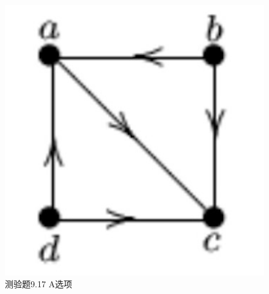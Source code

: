 \documentclass[UTF8, heading=true]{ctexart}
\begin{document}
\begin{figure}[H]
  \centering
  \begin{minipage}[t]{0.22\textwidth}
      \centering
      \includegraphics[width=1\textwidth]{9.17_1.jpg} %
      \vspace{-0.3cm}
      \caption{测验题9.17 A选项}
  \end{minipage}
  \hspace{0.18\textwidth} %
  \begin{minipage}[t]{0.2\textwidth}
      \centering

\end{minipage}
\end{figure}
\end{document}
